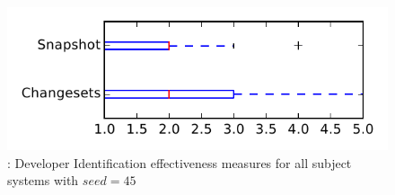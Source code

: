 
\begin{figure}
\centering
\includegraphics[height=0.4\textheight]{figures/dit_seed/rq1_tiny_45}
\caption{\rtwo: Developer Identification effectiveness measures for all subject systems with $seed=45$}
\label{fig:dit_seed:rq1:tiny}
\end{figure}
